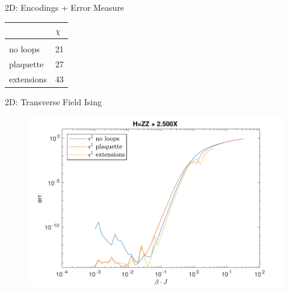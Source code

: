 \begin{frame}{2D: Encodings + Error Measure}
\begin{minipage}{.6\textwidth}
    \end{minipage}
    \begin{minipage}{.39\textwidth}
        \begin{table}[]
            \begin{tabular}{l|l }
                           & $\chi$ \\
                \hline              \\
                no loops   & 21     \\
                plaquette  & 27     \\
                extensions & 43     \\
            \end{tabular}
        \end{table}

    \end{minipage}

\end{frame}

\begin{frame}{2D: Transverse Field Ising}

    \begin{figure}
        \center
        \includegraphics[height=\textheight]{../Figuren/benchmarking/2D_err_presentation}
    \end{figure}

\end{frame}

